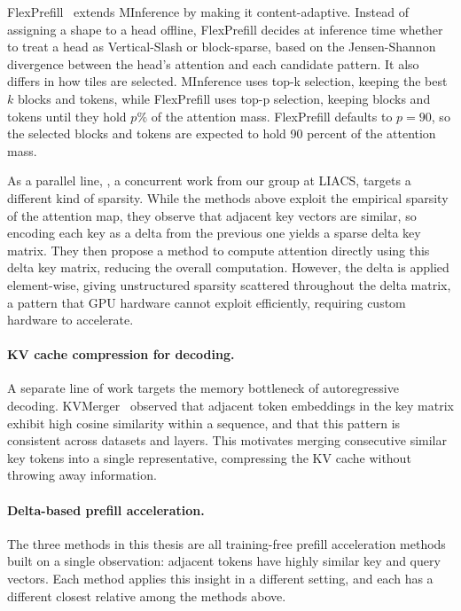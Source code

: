 FlexPrefill~\citep{lai2025flexprefill} extends MInference by making it content-adaptive. Instead of assigning a shape to a head offline, FlexPrefill decides at inference time whether to treat a head as Vertical-Slash or block-sparse, based on the Jensen-Shannon divergence between the head's attention and each candidate pattern. It also differs in how tiles are selected. MInference uses top-k selection, keeping the best $k$ blocks and tokens, while FlexPrefill uses top-p selection, keeping blocks and tokens until they hold $p\%$ of the attention mass. FlexPrefill defaults to $p=90$, so the selected blocks and tokens are expected to hold 90 percent of the attention mass.


As a parallel line, \citet{qi2024deltallm}, a concurrent work from our group at LIACS, targets a different kind of sparsity.
While the methods above exploit the empirical sparsity of the attention map, they observe that adjacent key vectors are similar, so encoding each key as a delta from the previous one yields a sparse delta key matrix.
They then propose a method to compute attention directly using this delta key matrix, reducing the overall computation.
However, the delta is applied element-wise, giving unstructured sparsity scattered throughout the delta matrix, a pattern that GPU hardware cannot exploit efficiently, requiring custom hardware to accelerate.

\paragraph{KV cache compression for decoding.}
A separate line of work targets the memory bottleneck of autoregressive decoding.
KVMerger~\citep{wang2024kvmerger} observed that adjacent token embeddings in the key matrix exhibit high cosine similarity within a sequence, and that this pattern is consistent across datasets and layers. This motivates merging consecutive similar key tokens into a single representative, compressing the KV cache without throwing away information.

\paragraph{Delta-based prefill acceleration.}
The three methods in this thesis are all training-free prefill acceleration methods built on a single observation: adjacent tokens have highly similar key and query vectors.
Each method applies this insight in a different setting, and each has a different closest relative among the methods above.

